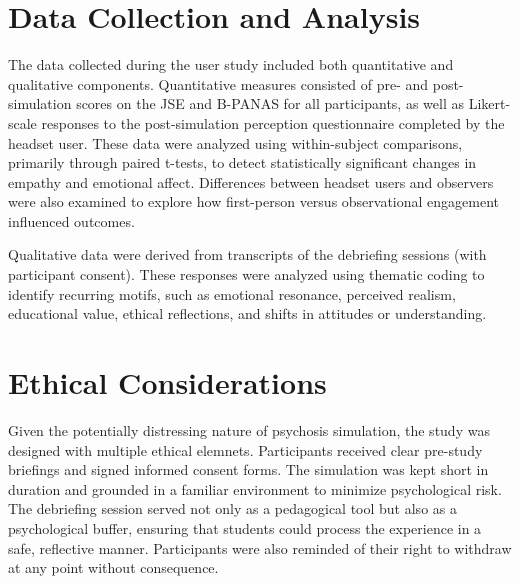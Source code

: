 \section{Data Collection and Analysis}

The data collected during the user study included both quantitative and qualitative components. Quantitative measures consisted of pre- and post-simulation scores on the JSE and B-PANAS for all participants, as well as Likert-scale responses to the post-simulation perception questionnaire completed by the headset user. These data were analyzed using within-subject comparisons, primarily through paired t-tests, to detect statistically significant changes in empathy and emotional affect. Differences between headset users and observers were also examined to explore how first-person versus observational engagement influenced outcomes.

Qualitative data were derived from transcripts of the debriefing sessions (with participant consent). These responses were analyzed using thematic coding to identify recurring motifs, such as emotional resonance, perceived realism, educational value, ethical reflections, and shifts in attitudes or understanding.

\section{Ethical Considerations}

Given the potentially distressing nature of psychosis simulation, the study was designed with multiple ethical elemnets. Participants received clear pre-study briefings and signed informed consent forms. The simulation was kept short in duration and grounded in a familiar environment to minimize psychological risk. The debriefing session served not only as a pedagogical tool but also as a psychological buffer, ensuring that students could process the experience in a safe, reflective manner. Participants were also reminded of their right to withdraw at any point without consequence.
